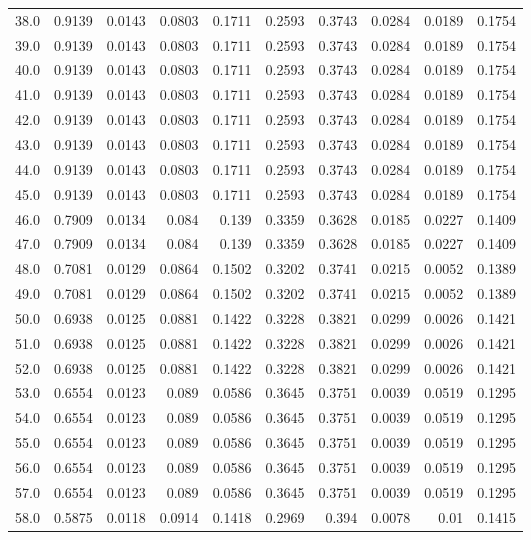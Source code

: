 \begin{longtable}{lrrrrrrrrr}
38.0 & 0.9139 & 0.0143 & 0.0803 & 0.1711 & 0.2593 & 0.3743 & 0.0284 & 0.0189 & 0.1754 \\
39.0 & 0.9139 & 0.0143 & 0.0803 & 0.1711 & 0.2593 & 0.3743 & 0.0284 & 0.0189 & 0.1754 \\
40.0 & 0.9139 & 0.0143 & 0.0803 & 0.1711 & 0.2593 & 0.3743 & 0.0284 & 0.0189 & 0.1754 \\
41.0 & 0.9139 & 0.0143 & 0.0803 & 0.1711 & 0.2593 & 0.3743 & 0.0284 & 0.0189 & 0.1754 \\
42.0 & 0.9139 & 0.0143 & 0.0803 & 0.1711 & 0.2593 & 0.3743 & 0.0284 & 0.0189 & 0.1754 \\
43.0 & 0.9139 & 0.0143 & 0.0803 & 0.1711 & 0.2593 & 0.3743 & 0.0284 & 0.0189 & 0.1754 \\
44.0 & 0.9139 & 0.0143 & 0.0803 & 0.1711 & 0.2593 & 0.3743 & 0.0284 & 0.0189 & 0.1754 \\
45.0 & 0.9139 & 0.0143 & 0.0803 & 0.1711 & 0.2593 & 0.3743 & 0.0284 & 0.0189 & 0.1754 \\
46.0 & 0.7909 & 0.0134 & 0.084 & 0.139 & 0.3359 & 0.3628 & 0.0185 & 0.0227 & 0.1409 \\
47.0 & 0.7909 & 0.0134 & 0.084 & 0.139 & 0.3359 & 0.3628 & 0.0185 & 0.0227 & 0.1409 \\
48.0 & 0.7081 & 0.0129 & 0.0864 & 0.1502 & 0.3202 & 0.3741 & 0.0215 & 0.0052 & 0.1389 \\
49.0 & 0.7081 & 0.0129 & 0.0864 & 0.1502 & 0.3202 & 0.3741 & 0.0215 & 0.0052 & 0.1389 \\
50.0 & 0.6938 & 0.0125 & 0.0881 & 0.1422 & 0.3228 & 0.3821 & 0.0299 & 0.0026 & 0.1421 \\
51.0 & 0.6938 & 0.0125 & 0.0881 & 0.1422 & 0.3228 & 0.3821 & 0.0299 & 0.0026 & 0.1421 \\
52.0 & 0.6938 & 0.0125 & 0.0881 & 0.1422 & 0.3228 & 0.3821 & 0.0299 & 0.0026 & 0.1421 \\
53.0 & 0.6554 & 0.0123 & 0.089 & 0.0586 & 0.3645 & 0.3751 & 0.0039 & 0.0519 & 0.1295 \\
54.0 & 0.6554 & 0.0123 & 0.089 & 0.0586 & 0.3645 & 0.3751 & 0.0039 & 0.0519 & 0.1295 \\
55.0 & 0.6554 & 0.0123 & 0.089 & 0.0586 & 0.3645 & 0.3751 & 0.0039 & 0.0519 & 0.1295 \\
56.0 & 0.6554 & 0.0123 & 0.089 & 0.0586 & 0.3645 & 0.3751 & 0.0039 & 0.0519 & 0.1295 \\
57.0 & 0.6554 & 0.0123 & 0.089 & 0.0586 & 0.3645 & 0.3751 & 0.0039 & 0.0519 & 0.1295 \\
58.0 & 0.5875 & 0.0118 & 0.0914 & 0.1418 & 0.2969 & 0.394 & 0.0078 & 0.01 & 0.1415 \\

\end{longtable}
